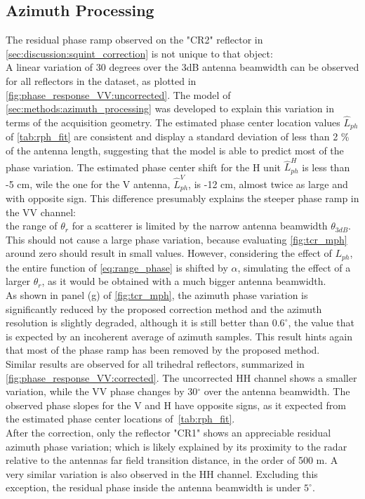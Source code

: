 \subsection{Azimuth Processing}\label{sec:discussion:azimuth_processing}
The residual phase ramp observed on the "CR2" reflector in \autoref{sec:discussion:squint_correction} is not unique to that object:\\ A linear variation of 30 degrees over the 3dB antenna beamwidth can be observed for all reflectors in the dataset, as plotted in \autoref{fig:phase_response_VV:uncorrected}.  The model of \autoref{sec:methods:azimuth_processing} was developed to explain this variation in terms of the acquisition geometry.
The estimated phase center location values $\hat{L}_{ph}$ of \autoref{tab:rph_fit} are consistent and display a standard deviation of less than 2 \% of the antenna length, suggesting that the model is able to predict most of the phase variation. The estimated phase center shift for the H unit $\hat{L}_{ph}^{H}$ is less than -5 cm, wile the one for the V antenna, $\hat{L}_{ph}^{V}$, is -12 cm, almost twice as large and with opposite sign. This difference presumably explains the steeper phase ramp in the VV channel:\\
the range of $\theta_r$ for a scatterer is limited by the narrow antenna beamwidth $\theta_{3dB}$. This should not cause a large phase variation, because evaluating \eqref{fig:tcr_mph} around zero should result in small values. However, considering the effect of $L_{ph}$, the entire function of \autoref{eq:range_phase} is shifted  by $\alpha$, simulating the effect of a larger $\theta_r$, as it would be obtained with a much bigger antenna beamwidth.\\
As shown in panel (g) of \autoref{fig:tcr_mph}, the azimuth phase variation is significantly reduced by the proposed correction method and the azimuth resolution is slightly degraded, although it is still better than $0.6^\circ$, the value that is expected by an incoherent average of azimuth samples. This result hints again that most of the phase ramp has been removed by the proposed method.\\
Similar results are observed for all trihedral reflectors, summarized in \autoref{fig:phase_response_VV:corrected}. The uncorrected HH channel shows a smaller variation, while the VV phase changes by 30$^\circ$ over the antenna beamwidth. The observed phase slopes for the V and H have opposite signs, as it expected from the estimated phase center locations of~\autoref{tab:rph_fit}.\\  After the correction, only the reflector "CR1" shows an appreciable residual azimuth phase variation; which is likely explained by its proximity to the radar relative to the antennas far field transition distance, in the order of 500 m. A very similar variation is also observed in the HH channel. Excluding this exception, the residual phase inside the antenna beamwidth is under $5^\circ$.
